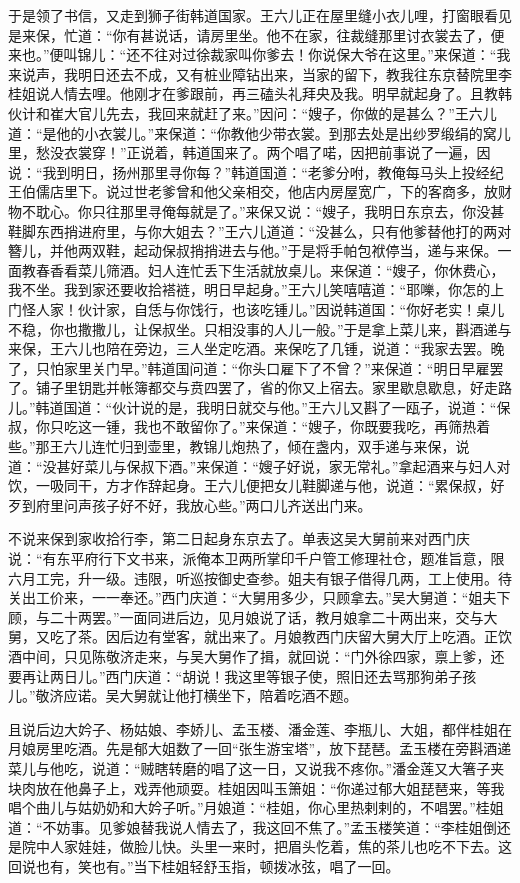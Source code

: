 于是领了书信，又走到狮子街韩道国家。王六儿正在屋里缝小衣儿哩，打窗眼看见是来保，忙道：“你有甚说话，请房里坐。他不在家，往裁缝那里讨衣裳去了，便来也。”便叫锦儿：“还不往对过徐裁家叫你爹去！你说保大爷在这里。”来保道：“我来说声，我明日还去不成，又有桩业障钻出来，当家的留下，教我往东京替院里李桂姐说人情去哩。他刚才在爹跟前，再三磕头礼拜央及我。明早就起身了。且教韩伙计和崔大官儿先去，我回来就赶了来。”因问：“嫂子，你做的是甚么？”王六儿道：“是他的小衣裳儿。”来保道：“你教他少带衣裳。到那去处是出纱罗缎绢的窝儿里，愁没衣裳穿！”正说着，韩道国来了。两个唱了喏，因把前事说了一遍，因说：“我到明日，扬州那里寻你每？”韩道国道：“老爹分咐，教俺每马头上投经纪王伯儒店里下。说过世老爹曾和他父亲相交，他店内房屋宽广，下的客商多，放财物不耽心。你只往那里寻俺每就是了。”来保又说：“嫂子，我明日东京去，你没甚鞋脚东西捎进府里，与你大姐去？”王六儿道道：“没甚么，只有他爹替他打的两对簪儿，并他两双鞋，起动保叔捎捎进去与他。”于是将手帕包袱停当，递与来保。一面教春香看菜儿筛酒。妇人连忙丢下生活就放桌儿。来保道：“嫂子，你休费心，我不坐。我到家还要收拾褡裢，明日早起身。”王六儿笑嘻嘻道：“耶嚛，你怎的上门怪人家！伙计家，自恁与你饯行，也该吃锺儿。”因说韩道国：“你好老实！桌儿不稳，你也撒撒儿，让保叔坐。只相没事的人儿一般。”于是拿上菜儿来，斟酒递与来保，王六儿也陪在旁边，三人坐定吃酒。来保吃了几锺，说道：“我家去罢。晚了，只怕家里关门早。”韩道国问道：“你头口雇下了不曾？”来保道：“明日早雇罢了。铺子里钥匙并帐簿都交与贲四罢了，省的你又上宿去。家里歇息歇息，好走路儿。”韩道国道：“伙计说的是，我明日就交与他。”王六儿又斟了一瓯子，说道：“保叔，你只吃这一锺，我也不敢留你了。”来保道：“嫂子，你既要我吃，再筛热着些。”那王六儿连忙归到壶里，教锦儿炮热了，倾在盏内，双手递与来保，说道：“没甚好菜儿与保叔下酒。”来保道：“嫂子好说，家无常礼。”拿起酒来与妇人对饮，一吸同干，方才作辞起身。王六儿便把女儿鞋脚递与他，说道：“累保叔，好歹到府里问声孩子好不好，我放心些。”两口儿齐送出门来。

不说来保到家收拾行李，第二日起身东京去了。单表这吴大舅前来对西门庆说：“有东平府行下文书来，派俺本卫两所掌印千户管工修理社仓，题准旨意，限六月工完，升一级。违限，听巡按御史查参。姐夫有银子借得几两，工上使用。待关出工价来，一一奉还。”西门庆道：“大舅用多少，只顾拿去。”吴大舅道：“姐夫下顾，与二十两罢。”一面同进后边，见月娘说了话，教月娘拿二十两出来，交与大舅，又吃了茶。因后边有堂客，就出来了。月娘教西门庆留大舅大厅上吃酒。正饮酒中间，只见陈敬济走来，与吴大舅作了揖，就回说：“门外徐四家，禀上爹，还要再让两日儿。”西门庆道：“胡说！我这里等银子使，照旧还去骂那狗弟子孩儿。”敬济应诺。吴大舅就让他打横坐下，陪着吃酒不题。

且说后边大妗子、杨姑娘、李娇儿、孟玉楼、潘金莲、李瓶儿、大姐，都伴桂姐在月娘房里吃酒。先是郁大姐数了一回“张生游宝塔”，放下琵琶。孟玉楼在旁斟酒递菜儿与他吃，说道：“贼瞎转磨的唱了这一日，又说我不疼你。”潘金莲又大箸子夹块肉放在他鼻子上，戏弄他顽耍。桂姐因叫玉箫姐：“你递过郁大姐琵琶来，等我唱个曲儿与姑奶奶和大妗子听。”月娘道：“桂姐，你心里热剌剌的，不唱罢。”桂姐道：“不妨事。见爹娘替我说人情去了，我这回不焦了。”孟玉楼笑道：“李桂姐倒还是院中人家娃娃，做脸儿快。头里一来时，把眉头忔着，焦的茶儿也吃不下去。这回说也有，笑也有。”当下桂姐轻舒玉指，顿拨冰弦，唱了一回。

